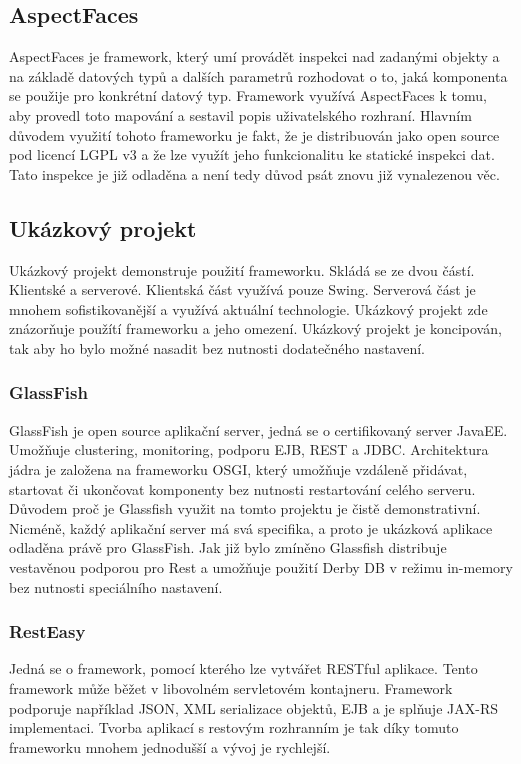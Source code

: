 \subsection{AspectFaces}
AspectFaces je framework, který umí provádět inspekci nad zadanými objekty a na základě datových typů a dalších parametrů rozhodovat o to, jaká komponenta se použije pro konkrétní datový typ. Framework využívá AspectFaces k tomu, aby provedl toto mapování a sestavil popis uživatelského rozhraní. Hlavním důvodem využití tohoto frameworku je fakt, že je distribuován jako open source pod licencí LGPL v3 a že lze využít jeho funkcionalitu ke statické inspekci dat. Tato inspekce je již odladěna a není tedy důvod psát znovu již vynalezenou věc. 
\subsection{Ukázkový projekt}
Ukázkový projekt demonstruje použití frameworku. Skládá se ze dvou částí. Klientské a serverové. Klientská část využívá pouze Swing. Serverová část je mnohem sofistikovanější a využívá aktuální technologie. Ukázkový projekt zde znázorňuje použítí frameworku a jeho omezení. Ukázkový projekt je koncipován, tak aby ho bylo možné nasadit bez nutnosti dodatečného nastavení.
\subsubsection{GlassFish}
GlassFish \cite{glassfish} je open source aplikační server, jedná se o certifikovaný server JavaEE. Umožňuje clustering, monitoring, podporu EJB, REST a JDBC. Architektura jádra je založena na frameworku OSGI, který umožňuje vzdáleně přidávat, startovat či ukončovat komponenty bez nutnosti restartování celého serveru. Důvodem proč je Glassfish využit na tomto projektu je čistě demonstrativní. Nicméně, každý aplikační server má svá specifika, a proto je ukázková aplikace odladěna právě pro GlassFish. Jak již bylo zmíněno Glassfish distribuje vestavěnou podporou pro Rest a umožňuje použití Derby DB v režimu in-memory bez nutnosti speciálního nastavení.
\subsubsection{RestEasy}
Jedná se o framework, pomocí kterého lze vytvářet RESTful aplikace. Tento framework může běžet v libovolném servletovém kontajneru. Framework podporuje například JSON, XML serializace objektů, EJB a je splňuje JAX-RS implementaci. Tvorba aplikací s restovým rozhranním je tak díky tomuto frameworku mnohem jednodušší a vývoj je rychlejší. 
